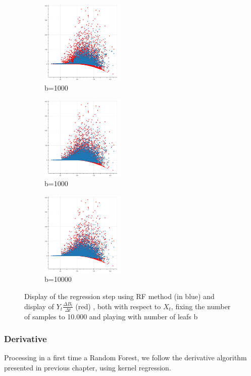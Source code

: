 \documentclass[english,11pt,openany]{report}
\theoremstyle{definition}
\theoremstyle{plain}
\theoremstyle{definition}
\begin{document}
\begin{figure}[H]
	\begin{subfigure}[t]{0.3\textwidth}
		\includegraphics[width=40mm]{RF_analysis/RF_1000.png}
		\caption{b=1000}
		\label{fig:d}
	\end{subfigure}
	\begin{subfigure}[t]{0.3\textwidth}
		\includegraphics[width=40mm]{RF_analysis/RF_5000.png}
		\caption{b=1000}
		\label{fig:c}
	\end{subfigure}	
	\begin{subfigure}[t]{0.3\textwidth}
		\includegraphics[width=40mm]{RF_analysis/RF_10000.png}
		\caption{b=10000}
		\label{fig:d}
	\end{subfigure}
	
	\caption{Display of the regression step using RF method (in blue) and display of $Y_{t}\frac{\Delta B_t}{\Delta t}$ (red) , both with respect to $X_t$, fixing the number of samples to 10.000 and playing with number of leafs b}
\end{figure}


 \subsubsection{Derivative}

Processing in a first time a Random Forest, we follow the derivative algorithm presented in previous chapter, using kernel regression. 
\end{document}

